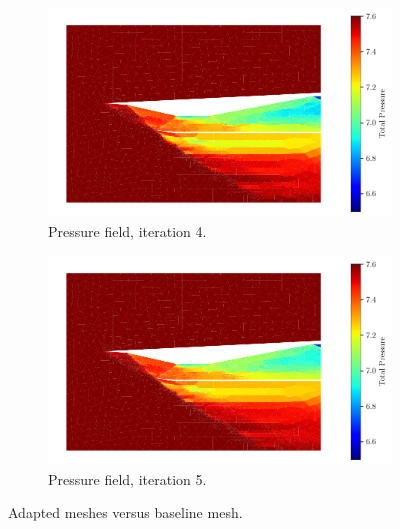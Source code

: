 \begin{figure}[h!]
    \begin{subfigure}[h]{0.49\linewidth}
        \centering
        \includegraphics[width=\linewidth]{rep/q4/Pfield4.pdf}
        \caption{Pressure field, iteration 4.}
    \end{subfigure}
    \begin{subfigure}[h]{0.49\linewidth}
        \centering
        \includegraphics[width=\linewidth]{rep/q4/Pfield5.pdf}
        \caption{Pressure field, iteration 5.}\label{fig:pfield5}
    \end{subfigure}
    \caption[Adapted Meshes Versus Baseline Mesh]{Adapted meshes versus baseline mesh.}
    \label{fig:adapted_meshes}
\end{figure}



\pagebreak

